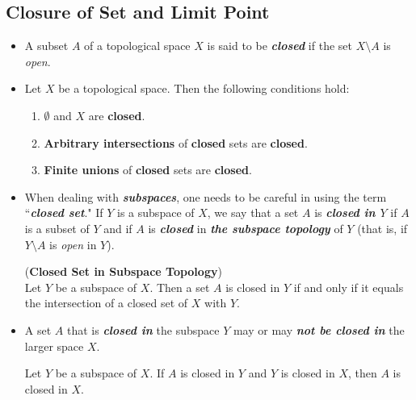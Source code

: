 \documentclass[11pt]{article}
\begin{document}
\subsection{Closure of Set and Limit Point}
\begin{itemize}
\item \begin{definition}
A subset $A$ of a topological space $X$ is said to be \emph{\textbf{closed}} if the set $X \setminus A$ is \emph{open}.
\end{definition}

\item \begin{proposition}
Let $X$ be a topological space. Then the following conditions hold:
\begin{enumerate}
\item $\emptyset$ and $X$ are \textbf{closed}.
\item \textbf{Arbitrary intersections} of \textbf{closed} sets are \textbf{closed}.
\item \textbf{Finite unions} of \textbf{closed} sets are \textbf{closed}.
\end{enumerate}
\end{proposition}

\item \begin{remark}
When dealing with \emph{\textbf{subspaces}}, one needs to be careful in using the term ``\emph{\textbf{closed set}}." If $Y$ is a subspace of $X$, we say that a set $A$ is \emph{\textbf{closed in $Y$}} if $A$ is a subset of $Y$ and if $A$ is \textbf{\emph{closed}} in \emph{\textbf{the subspace topology}} of $Y$ (that is, if $Y \setminus A$ is \emph{open} in $Y$).
\end{remark}

\begin{proposition} (\textbf{Closed Set in Subspace Topology})\\
Let $Y$ be a subspace of $X$. Then a set $A$ is closed in $Y$ if and only if it equals the intersection of a closed set of $X$ with $Y$.
\end{proposition}

\item \begin{remark}
A set $A$ that is \emph{\textbf{closed in}} the subspace $Y$ may or may \emph{\textbf{not be closed in}} the larger space $X$.
\end{remark}

\begin{proposition}
Let $Y$ be a subspace of $X$. If $A$ is closed in $Y$ and $Y$ is closed in $X$, then $A$ is closed in $X$.
\end{proposition}


\end{itemize}
\end{document}
